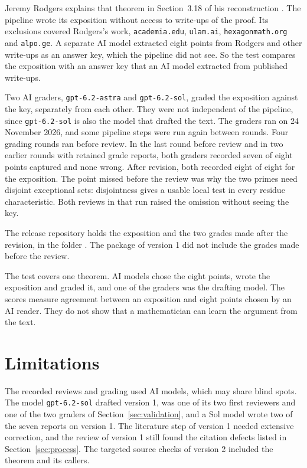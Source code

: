 \documentclass[11pt]{amsart}
\theoremstyle{definition}
\theoremstyle{remark}
\begin{document}
Jeremy Rodgers explains that theorem in Section~3.18 of his reconstruction
\cite[Section~3.18, pp.~57--59]{Rodgers}. The pipeline wrote its exposition
without access to write-ups of the proof. Its exclusions covered Rodgers's
work, \texttt{academia.edu}, \texttt{ulam.ai}, \texttt{hexagonmath.org} and
\texttt{alpo.ge}. A separate AI model extracted eight points from Rodgers
and other write-ups as an answer key, which the pipeline did not see. So the
test compares the exposition with an answer key that an AI model extracted
from published write-ups.

Two AI graders, \texttt{gpt-6.2-astra} and \texttt{gpt-6.2-sol}, graded the
exposition against the key, separately from each other. They were not
independent of the pipeline, since \texttt{gpt-6.2-sol} is also the model
that drafted the text. The graders ran on 24 November 2026, and some
pipeline steps were run again between rounds. Four grading rounds ran
before review. In the last round before review and in two earlier rounds
with retained grade reports, both graders recorded seven of eight points
captured and none wrong. After revision, both recorded eight of eight for
the exposition. The point missed before
the review was why the two primes need disjoint exceptional sets:
disjointness gives a usable local test in every residue characteristic. Both
reviews in that run raised the omission without seeing the key.

The release repository holds the exposition and the two grades made after
the revision, in the folder . The package of
version 1 did not include the grades made before the review.

The test covers one theorem. AI models chose the eight points, wrote the
exposition and graded it, and one of the graders was the drafting model. The
scores measure agreement between an exposition and eight points chosen by an
AI reader. They do not show that a mathematician can learn the argument from
the text.

\section{Limitations}\label{sec:limitations}

The recorded reviews and grading used AI
models, which may share blind spots. The model \texttt{gpt-6.2-sol} drafted
version 1, was one of its two first reviewers and one of the two graders of
Section~\ref{sec:validation}, and a Sol model wrote two of the seven reports
on version 1. The literature step of version 1 needed extensive correction,
and the review of version 1 still found the citation defects listed in
Section~\ref{sec:process}. The targeted source checks of version 2 included the theorem and its
callers.
\end{document}
